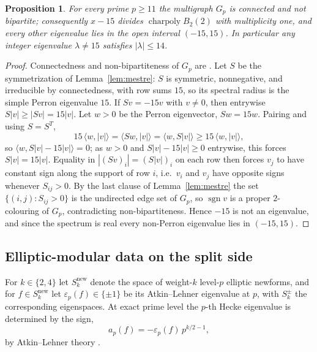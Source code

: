 \documentclass[11pt]{amsart}
\theoremstyle{plain}
\newtheorem{proposition}[theorem]{Proposition}
\theoremstyle{definition}
\newcommand{\snew}{S^{\mathrm{new}}}
\newcommand{\eps}{\varepsilon}
\DeclareMathOperator{\charp}{charpoly}
\providecommand{\snew}{S^{\mathrm{new}}}
\providecommand{\charp}{\operatorname{charpoly}}
\begin{document}
	\begin{proposition}\label{prop:frame}
		For every prime $p\ge11$ the multigraph $G_p$ is connected and not
		bipartite; consequently $x-15$ divides $\charp B_2(2)$ with multiplicity
		one, and every other eigenvalue lies in the open interval $(-15,15)$. In
		particular any integer eigenvalue $\lambda\ne15$ satisfies
		$|\lambda|\le14$.
	\end{proposition}
	
	\begin{proof}
		Connectedness and non-bipartiteness of $G_p$ are
		\cite[Thm.~44]{JordanZaytman}. Let $S$ be the symmetrization of
		Lemma~\ref{lem:mestre}: $S$ is symmetric, nonnegative, and irreducible by
		connectedness, with row sums $15$, so its spectral radius is the simple
		Perron eigenvalue $15$. If $Sv=-15v$ with $v\ne0$, then entrywise
		$S|v|\ge|Sv|=15|v|$. Let $w>0$ be the Perron eigenvector, $Sw=15w$.
		Pairing and using $S=S^{T}$,
		\[
		15\,\langle w,|v|\rangle=\langle Sw,|v|\rangle=\langle w,S|v|\rangle
		\ge15\,\langle w,|v|\rangle,
		\]
		so $\langle w,S|v|-15|v|\rangle=0$; as $w>0$ and $S|v|-15|v|\ge0$
		entrywise, this forces $S|v|=15|v|$. Equality in $|(Sv)_i|=(S|v|)_i$ on
		each row then forces $v_j$ to have constant sign along the support of row
		$i$, i.e.\ $v_i$ and $v_j$ have opposite signs whenever $S_{ij}>0$. By the
		last clause of Lemma~\ref{lem:mestre} the set $\{(i,j):S_{ij}>0\}$ is the
		undirected edge set of $G_p$, so $\operatorname{sgn}v$ is a proper
		$2$-colouring of $G_p$, contradicting non-bipartiteness. Hence $-15$ is
		not an eigenvalue, and since the spectrum is real every non-Perron
		eigenvalue lies in $(-15,15)$.
	\end{proof}
	
	\subsection{Elliptic-modular data on the split side}
	\label{ss:split}
	
	For $k\in\{2,4\}$ let $\snew_k$ denote the space of weight-$k$ level-$p$
	elliptic newforms, and for $f\in\snew_k$ let $\eps_p(f)\in\{\pm1\}$ be its
	Atkin--Lehner eigenvalue at $p$, with $S_k^{\pm}$ the corresponding
	eigenspaces. At exact prime level the $p$-th Hecke eigenvalue is determined
	by the sign,
	\begin{equation}\label{eq:ap-sign}
		a_p(f)=-\eps_p(f)\,p^{k/2-1},
	\end{equation}
	by Atkin--Lehner theory \cite[Thm.~3]{AtkinLehner}.
	
\end{document}
